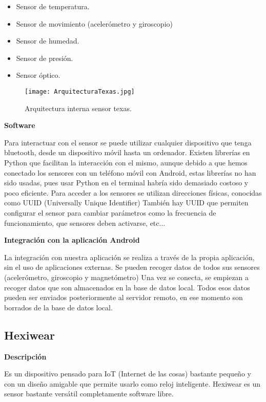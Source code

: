 \begin{itemize}
  \item Sensor de temperatura.
  \item Sensor de movimiento (acelerómetro y giroscopio)
  \item Sensor de humedad.
  \item Sensor de presión.
  \item Sensor óptico.
\end{itemize}

\begin{figure}[h!]
  \centering
  \texttt{[image: ArquitecturaTexas.jpg]}
  \caption{Arquitectura interna sensor texas.}
\end{figure}
\newpage

{\bf Software}
\newline

Para interactuar con el sensor se puede utilizar cualquier dispositivo que tenga bluetooth, desde un dispositivo móvil hasta un ordenador. Existen librerías en Python que facilitan la interacción con el mismo, aunque debido a que hemos conectado los sensores con un teléfono móvil con Android, estas librerías no han sido usadas, pues usar Python en el terminal habría sido demasiado costoso y poco eficiente. Para acceder a los sensores se utilizan direcciones físicas, conocidas como UUID (Universally Unique Identifier) También hay UUID que permiten configurar el sensor para cambiar parámetros como la frecuencia de funcionamiento, que sensores deben activarse, etc...
\newline

{\bf Integración con la aplicación Android}
\newline

La integración con nuestra aplicación se realiza a través de la propia aplicación, sin el uso de aplicaciones externas. Se pueden recoger datos de todos sus sensores (acelerómetro, giroscopio y magnetómetro) Una vez se conecta, se empiezan a recoger datos que son almacenados en la base de datos local. Todos esos datos pueden ser enviados posteriormente al servidor remoto, en ese momento son borrados de la base de datos local.

\subsection{Hexiwear}
{\bf Descripción}
\newline

Es un dispositivo pensado para IoT (Internet de las cosas) bastante pequeño y con un diseño amigable que permite usarlo como reloj inteligente. Hexiwear es un sensor bastante versátil completamente software libre.
\newline


